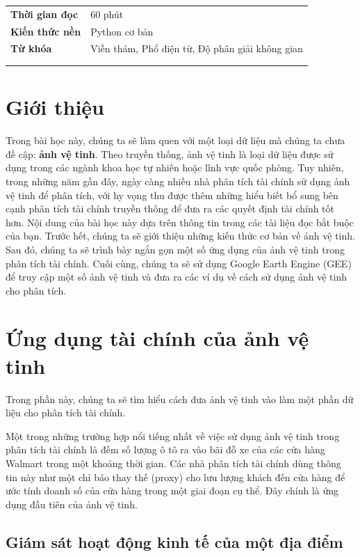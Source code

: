 {\small
\begin{longtable}[]{@{}ll@{}}
\toprule\noalign{}
\endhead
\bottomrule\noalign{}
\endlastfoot
\textbf{Thời gian đọc} & 60 phút \\
\textbf{Kiến thức nền} & Python cơ bản \\
\textbf{Từ khóa} & Viễn thám, Phổ điện từ, Độ phân giải không gian \\
& \\
& \\
\end{longtable}
}

\section{Giới thiệu}

Trong bài học này, chúng ta sẽ làm quen với một loại dữ liệu mà chúng ta chưa đề cập: \textbf{ảnh vệ tinh}. Theo truyền thống, ảnh vệ tinh là loại dữ liệu được sử dụng trong các ngành khoa học tự nhiên hoặc lĩnh vực quốc phòng. Tuy nhiên, trong những năm gần đây, ngày càng nhiều nhà phân tích tài chính sử dụng ảnh vệ tinh để phân tích, với hy vọng thu được thêm những hiểu biết bổ sung bên cạnh phân tích tài chính truyền thống để đưa ra các quyết định tài chính tốt hơn. Nội dung của bài học này dựa trên thông tin trong các tài liệu đọc bắt buộc của bạn. Trước hết, chúng ta sẽ giới thiệu những kiến thức cơ bản về ảnh vệ tinh. Sau đó, chúng ta sẽ trình bày ngắn gọn một số ứng dụng của ảnh vệ tinh trong phân tích tài chính. Cuối cùng, chúng ta sẽ sử dụng Google Earth Engine (GEE) để truy cập một số ảnh vệ tinh và đưa ra các ví dụ về cách sử dụng ảnh vệ tinh cho phân tích.

\section{Ứng dụng tài chính của ảnh vệ tinh}

Trong phần này, chúng ta sẽ tìm hiểu cách đưa ảnh vệ tinh vào làm một phần dữ liệu cho phân tích tài chính.

Một trong những trường hợp nổi tiếng nhất về việc sử dụng ảnh vệ tinh trong phân tích tài chính là đếm số lượng ô tô ra vào bãi đỗ xe của các cửa hàng Walmart trong một khoảng thời gian. Các nhà phân tích tài chính dùng thông tin này như một chỉ báo thay thế (proxy) cho lưu lượng khách đến cửa hàng để ước tính doanh số của cửa hàng trong một giai đoạn cụ thể. Đây chính là ứng dụng đầu tiên của ảnh vệ tinh.

\subsection{Giám sát hoạt động kinh tế của một địa điểm}

